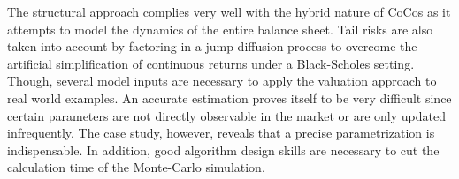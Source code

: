 The structural approach complies very well with the hybrid nature of CoCos as it attempts to model the dynamics of the entire balance sheet. Tail risks are also taken into account by factoring in a jump diffusion process to overcome the artificial simplification of continuous returns under a Black-Scholes setting. Though, several model inputs are necessary to apply the valuation approach to real world examples. An accurate estimation proves itself to be very difficult since certain parameters are not directly observable in the market or are only updated infrequently. The case study, however, reveals that a precise parametrization is indispensable. In addition, good algorithm design skills are necessary to cut the calculation time of the Monte-Carlo simulation.


